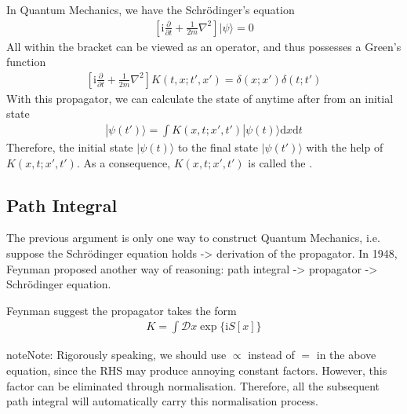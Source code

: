 \documentclass[letterpaper,10pt,english]{sphinxmanual}
\begin{document}
In Quantum Mechanics, we have the Schrödinger’s equation
\begin{equation*}
\begin{split}\left[\mathrm{i}\frac{\partial}{\partial t} + \frac{1}{2m}\nabla^2\right]|\psi\rangle = 0\end{split}
\end{equation*}
All within the bracket can be viewed as an operator, and thus possesses a Green's function
\begin{equation*}
\begin{split}\left[\mathrm{i}\frac{\partial}{\partial t} + \frac{1}{2m}\nabla^2\right]K(t,x;t',x') = \delta(x;x')\delta(t;t')\end{split}
\end{equation*}
With this propagator, we can calculate the state of anytime after from an initial state
\begin{equation*}
\begin{split}|\psi(t')\rangle = \int K(x,t;x',t')|\psi(t)\rangle\mathrm{d}x\mathrm{d}t\end{split}
\end{equation*}
Therefore, the initial state \(|\psi(t)\rangle\)  to the final state \(|\psi(t')\rangle\) with the help of \(K(x,t;x',t')\). As a consequence, \(K(x,t;x',t')\) is called the .


\subsection{Path Integral}
\label{\detokenize{pi_ppgt:path-integral}}
The previous argument is only one way to construct Quantum Mechanics, i.e. suppose the Schrödinger equation holds -\textgreater{} derivation of the propagator. In 1948, Feynman proposed another way of reasoning: path integral -\textgreater{} propagator -\textgreater{} Schrödinger equation.

Feynman suggest the propagator takes the form
\begin{equation*}
\begin{split}K = \int \mathcal{D}x \exp\{\mathrm{i}S[x]\}\end{split}
\end{equation*}
\begin{sphinxadmonition}{note}{Note:}
Rigorously speaking, we should use \(\propto\) instead of \(=\) in the above equation, since the RHS may produce annoying constant factors. However, this factor can be eliminated through normalisation. Therefore, all the subsequent path integral will automatically carry this normalisation process.
\end{sphinxadmonition}
\end{document}
